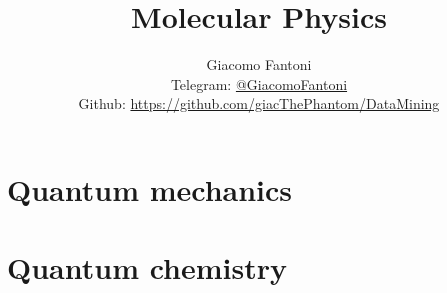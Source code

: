 

\title{\Huge \textbf{Molecular Physics}}

\author{
  Giacomo Fantoni \\
  \small Telegram: \href{https://t.me/GiacomoFantoni}{@GiacomoFantoni} \\[3pt]
  \small Github: \href{https://github.com/giacThePhantom/DataMining}{https://github.com/giacThePhantom/DataMining}}

\maketitle
\tableofcontents

  \part{Quantum mechanics}

    
    
    
    

  \part{Quantum chemistry}

    
    
    

\begin{appendices}

  
  
  
  
  
  

\end{appendices}


